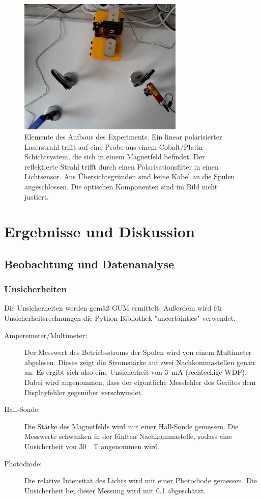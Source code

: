 \documentclass[
	a4paper,
	12pt,
	pagesize,
	ngerman
]{scrartcl}
\begin{document}
	\begin{figure}[H] 
		\includegraphics[width=0.7\textwidth]{O4_Aufbau} %
		\centering
		\caption{Elemente des Aufbaus des Experiments. Ein linear polarisierter Laserstrahl trifft auf eine Probe aus einem Cobalt/Platin-Schichtsystem, die sich in einem Magnetfeld befindet. Der reflektierte Strahl trifft durch einen Polarisationsfilter in einen Lichtsensor. Aus Übersichtsgründen sind keine Kabel an die Spulen angeschlossen. Die optischen Komponenten sind im Bild nicht justiert.} 
		\label{fig_aufbau}
		\centering
	\end{figure}
	
	\section{Ergebnisse und Diskussion}
	

	\subsection{Beobachtung und Datenanalyse}
	\subsubsection{Unsicherheiten} %
	Die Unsicherheiten werden gemäß GUM ermittelt. 
	Außerdem wird für Unsicherheitsrechnungen die Python-Bibliothek "uncertainties" verwendet.
	\begin{description}
		\item[Amperemeter/Multimeter:] Der Messwert des Betriebsstroms der Spulen wird von einem Multimeter abgelesen. 
			Dieses zeigt die Stromstärke auf zwei Nachkommastellen genau an. 
			Es ergibt sich also eine Unsicherheit von \SI{3}{mA} (rechteckige WDF).
			Dabei wird angenommen, dass der eigentliche Messfehler des Gerätes dem Displayfehler gegenüber verschwindet. 
		\item[Hall-Sonde:]  Die Stärke des Magnetfelds wird mit einer Hall-Sonde gemessen. Die Messwerte schwanken in der fünften Nachkommastelle, sodass eine Unsicherheit von \SI{30}{\mu T} angenommen wird.
		\item[Photodiode:]  Die relative Intensität des Lichts wird mit einer Photodiode gemessen. Die Unsicherheit bei dieser Messung wird mit \SI{0,1}{} abgeschätzt.
	\end{description} 
\end{document}
